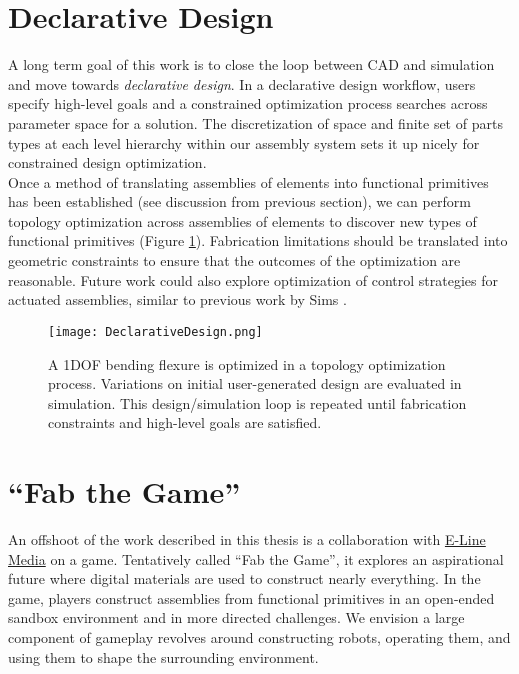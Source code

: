 {\section{Declarative Design}

A long term goal of this work is to close the loop between CAD and simulation and move towards \textit{declarative design}.  In a declarative design workflow, users specify high-level goals and a constrained optimization process searches across parameter space for a solution.  The discretization of space and finite set of parts types at each level hierarchy within our assembly system sets it up nicely for constrained design optimization.\\

Once a method of translating assemblies of elements into functional primitives has been established (see discussion from previous section), we can perform topology optimization across assemblies of elements to discover new types of functional primitives (Figure \ref{fig:DeclarativeDesign}).  Fabrication limitations should be translated into geometric constraints to ensure that the outcomes of the optimization are reasonable.  Future work could also explore optimization of control strategies for actuated assemblies, similar to previous work by Sims \cite{Sims1994}.

\begin{figure}
  \texttt{[image: DeclarativeDesign.png]}
  \caption{A 1DOF bending flexure is optimized in a topology optimization process.  Variations on initial user-generated design are evaluated in simulation.  This design/simulation loop is repeated until fabrication constraints and high-level goals are satisfied.}
  \label{fig:DeclarativeDesign}
\end{figure}

\section{``Fab the Game''}

An offshoot of the work described in this thesis is a collaboration with \href{http://elinemedia.com/}{E-Line Media} on a game.  Tentatively called ``Fab the Game'', it explores an aspirational future where digital materials are used to construct nearly everything.  In the game, players construct assemblies from functional primitives in an open-ended sandbox environment and in more directed challenges.  We envision a large component of gameplay revolves around constructing robots, operating them, and using them to shape the surrounding environment.\\

}
